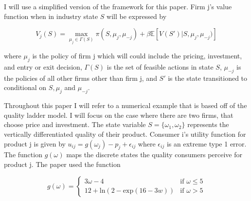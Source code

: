 \documentclass[12pt]{article}
\begin{document}

I will use a simplified version of the \citet{1995_Erickson_Pakes_RES} framework for this paper. Firm j's value function when in industry state $S$ will be expressed by

\begin{equation*}
  V_j(S)=\max_{\mu_j \in \Gamma(S)} \pi(S, \mu_j, \mu_{-j}) + \beta\mathbb{E}[V(S')|S,\mu_{j},\mu_{-j})]
\end{equation*}

where $\mu_j$ is the policy of firm j which will could include the pricing, investment, and entry or exit decision, $\Gamma(S)$ is the set of feasible actions in state $S$, $\mu_{-j}$ is the policies of all other firms other than firm j, and $S'$ is the state transitioned to conditional on $S,\mu_{j}$ and $\mu_{-j}$.

Throughout this paper I will refer to a numerical example that is based off of the \citet{1992_Pakes_McGuire_NBER} quality ladder model. I will focus on the case where there are two firms, that choose price and investment. The state variable $S=\{\omega_1,\omega_2\}$ represents the vertically differentiated quality of their product. Consumer i's utility function for product j is given by $u_{ij}=g(\omega_j) - p_j + \epsilon_{ij}$ where $\epsilon_{ij}$ is an extreme type 1 error. The function $g(\omega)$ maps the discrete states the quality consumers perceive for product j. The \citet{1992_Pakes_McGuire_NBER} paper used the function

\begin{equation*}
  g(\omega) =
  \begin{cases}
    3\omega-4 & \text{if } \omega \leq 5\\
    12+\text{ln}(2-\text{exp}(16-3w)) & \text{if } \omega >5
  \end{cases}
\end{equation*}
\end{document}
